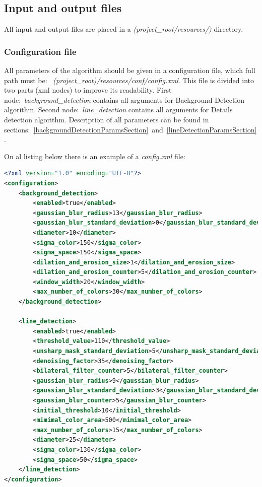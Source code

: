 \documentclass[a4paper,onecolumn,oneside,12pt]{memoir}
\begin{document}
\subsection{Input and output files}

All input and output files are placed in a \textit{(project\_root/resources/)} directory.

\subsubsection{Configuration file}

All parameters of the algorithm should be given in a configuration file, which full path must be:~
\textit{(project\_root)/resources/conf/config.xml}. This file is divided into two parts (xml nodes)
to improve its readability. First node:~\textit{background\_detection} contains all arguments for
Background Detection algorithm. Second node:~\textit{line\_detection} contains all arguments for
Details detection algorithm. Description of all parameters can be found in
sections:~\ref{backgroundDetectionParamsSection}~and~\ref{lineDetectionParamsSection}.

On al listing below there is an example of a \textit{config.xml} file:

\begin{lstlisting}[language=xml]
<?xml version="1.0" encoding="UTF-8"?>
<configuration>
    <background_detection>
        <enabled>true</enabled>
        <gaussian_blur_radius>13</gaussian_blur_radius>
        <gaussian_blur_standard_deviation>0</gaussian_blur_standard_deviation>
        <diameter>10</diameter>
        <sigma_color>150</sigma_color>
        <sigma_space>150</sigma_space>
        <dilation_and_erosion_size>1</dilation_and_erosion_size>
        <dilation_and_erosion_counter>5</dilation_and_erosion_counter>
        <window_width>20</window_width>
        <max_number_of_colors>30</max_number_of_colors>
    </background_detection>

    <line_detection>
        <enabled>true</enabled>
        <threshold_value>110</threshold_value>
        <unsharp_mask_standard_deviation>5</unsharp_mask_standard_deviation>
        <denoising_factor>35</denoising_factor>
        <bilateral_filter_counter>5</bilateral_filter_counter>
        <gaussian_blur_radius>9</gaussian_blur_radius>
        <gaussian_blur_standard_deviation>3</gaussian_blur_standard_deviation>
        <gaussian_blur_counter>5</gaussian_blur_counter>
        <initial_threshold>10</initial_threshold>
        <mimimal_color_area>500</mimimal_color_area>
        <max_number_of_colors>15</max_number_of_colors>
        <diameter>25</diameter>
        <sigma_color>130</sigma_color>
        <sigma_space>50</sigma_space>
    </line_detection>
</configuration>
\end{lstlisting}
\end{document}
